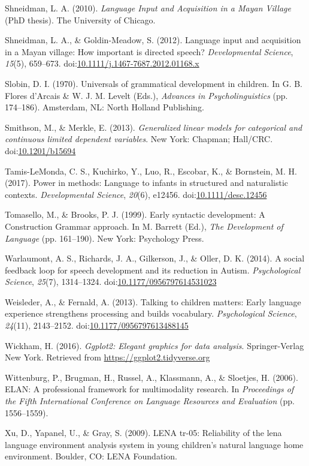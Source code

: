 \documentclass[,man,floatsintext]{apa6}
\begin{document}
\hypertarget{ref-shneidman2010language}{}
Shneidman, L. A. (2010). \emph{Language Input and Acquisition in a Mayan
Village} (PhD thesis). The University of Chicago.

\hypertarget{ref-shneidman2012language}{}
Shneidman, L. A., \& Goldin-Meadow, S. (2012). Language input and
acquisition in a Mayan village: How important is directed speech?
\emph{Developmental Science}, \emph{15}(5), 659--673.
doi:\href{https://doi.org/10.1111/j.1467-7687.2012.01168.x}{10.1111/j.1467-7687.2012.01168.x}

\hypertarget{ref-slobin1970universals}{}
Slobin, D. I. (1970). Universals of grammatical development in children.
In G. B. Flores d'Arcais \& W. J. M. Levelt (Eds.), \emph{Advances in
Psycholinguistics} (pp. 174--186). Amsterdam, NL: North Holland
Publishing.

\hypertarget{ref-smithson2013generalized}{}
Smithson, M., \& Merkle, E. (2013). \emph{Generalized linear models for
categorical and continuous limited dependent variables}. New York:
Chapman; Hall/CRC.
doi:\href{https://doi.org/10.1201/b15694}{10.1201/b15694}

\hypertarget{ref-tamislemonda2017power}{}
Tamis-LeMonda, C. S., Kuchirko, Y., Luo, R., Escobar, K., \& Bornstein,
M. H. (2017). Power in methods: Language to infants in structured and
naturalistic contexts. \emph{Developmental Science}, \emph{20}(6),
e12456.
doi:\href{https://doi.org/10.1111/desc.12456}{10.1111/desc.12456}

\hypertarget{ref-tomasello1999early}{}
Tomasello, M., \& Brooks, P. J. (1999). Early syntactic development: A
Construction Grammar approach. In M. Barrett (Ed.), \emph{The
Development of Language} (pp. 161--190). New York: Psychology Press.

\hypertarget{ref-warlaumont2014social}{}
Warlaumont, A. S., Richards, J. A., Gilkerson, J., \& Oller, D. K.
(2014). A social feedback loop for speech development and its reduction
in Autism. \emph{Psychological Science}, \emph{25}(7), 1314--1324.
doi:\href{https://doi.org/10.1177/0956797614531023}{10.1177/0956797614531023}

\hypertarget{ref-weisleder2013talking}{}
Weisleder, A., \& Fernald, A. (2013). Talking to children matters: Early
language experience strengthens processing and builds vocabulary.
\emph{Psychological Science}, \emph{24}(11), 2143--2152.
doi:\href{https://doi.org/10.1177/0956797613488145}{10.1177/0956797613488145}

\hypertarget{ref-R-ggplot2}{}
Wickham, H. (2016). \emph{Ggplot2: Elegant graphics for data analysis}.
Springer-Verlag New York. Retrieved from
\url{https://ggplot2.tidyverse.org}

\hypertarget{ref-ELAN}{}
Wittenburg, P., Brugman, H., Russel, A., Klassmann, A., \& Sloetjes, H.
(2006). ELAN: A professional framework for multimodality research. In
\emph{Proceedings of the Fifth International Conference on Language
Resources and Evaluation} (pp. 1556--1559).

\hypertarget{ref-xu2009reliability}{}
Xu, D., Yapanel, U., \& Gray, S. (2009). LENA tr-05: Reliability of the
lena language environment analysis system in young children's natural
language home environment. Boulder, CO: LENA Foundation.

\endgroup
\end{document}
